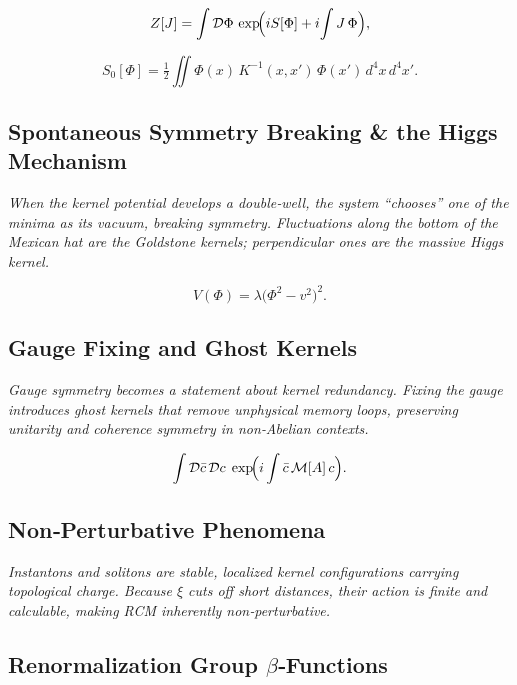 \begin{equation}\label{eq:gen_func}
Z[J]
= \int\mathcal D\Phi\,
  \exp\!\Bigl(iS[\Phi]+i\!\int J\,\Phi\Bigr),
\end{equation}

\begin{equation}\label{eq:free_action}
S_0[\Phi]
= \tfrac12\iint \Phi(x)\,K^{-1}(x,x')\,\Phi(x')\,d^4x\,d^4x'.
\end{equation}

\subsection{Spontaneous Symmetry Breaking \& the Higgs Mechanism}

\textit{When the kernel potential develops a double‐well, the system “chooses” one of the minima as its vacuum, breaking symmetry.  Fluctuations along the bottom of the Mexican hat are the Goldstone kernels; perpendicular ones are the massive Higgs kernel.}

\begin{equation}\label{eq:mexican_hat}
V(\Phi)=\lambda\bigl(\Phi^2 - v^2\bigr)^2.
\end{equation}

\subsection{Gauge Fixing and Ghost Kernels}

\textit{Gauge symmetry becomes a statement about kernel redundancy.  Fixing the gauge introduces ghost kernels that remove unphysical memory loops, preserving unitarity and coherence symmetry in non‐Abelian contexts.}

\[
\int\mathcal D\bar c\,\mathcal Dc\;
\exp\!\Bigl(i\int \bar c\,\mathcal M[A]\,c\Bigr).
\]

\subsection{Non‐Perturbative Phenomena}

\textit{Instantons and solitons are stable, localized kernel configurations carrying topological charge.  Because $\xi$ cuts off short distances, their action is finite and calculable, making RCM inherently non‐perturbative.}

\subsection{Renormalization Group \texorpdfstring{$\beta$}{β}‐Functions}

